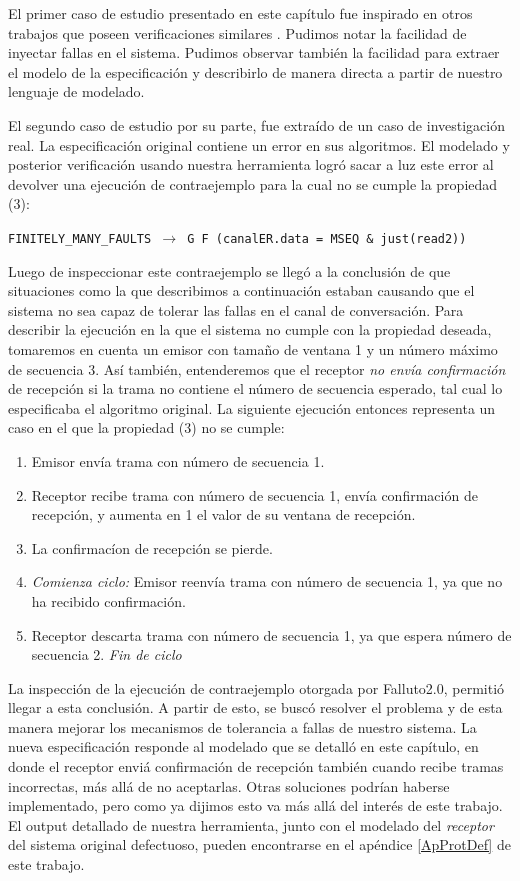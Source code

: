 \documentclass[pdftex,a4paper,12pt]{book}
\newcommand{\textff}[1]{\begin{center}\texttt{#1}\end{center}}
\begin{document}
El primer caso de estudio presentado en este cap\'itulo fue inspirado en otros trabajos que poseen verificaciones similares \cite{Hames,Arora}. Pudimos notar la facilidad de inyectar fallas en el sistema. Pudimos observar tambi\'en la facilidad para extraer el modelo de la especificaci\'on y describirlo de manera directa a partir de nuestro lenguaje de modelado.

El segundo caso de estudio por su parte, fue extra\'ido de un caso de investigaci\'on real. La especificaci\'on original contiene un error en sus algoritmos. El modelado y posterior verificaci\'on usando nuestra herramienta logr\'o sacar a luz este error al devolver una ejecuci\'on de contraejemplo para la cual no se cumple la propiedad (3): \textff{FINITELY\_MANY\_FAULTS $\rightarrow$ G~F~(canalER.data = MSEQ~\&~just(read2))} Luego de inspeccionar este contraejemplo se lleg\'o a la conclusi\'on de que situaciones como la que describimos a continuaci\'on estaban causando que el sistema no sea capaz de tolerar las fallas en el canal de conversaci\'on. Para describir la ejecuci\'on en la que el sistema no cumple con la propiedad deseada, tomaremos en cuenta un emisor con tama\~no de ventana 1 y un n\'umero m\'aximo de secuencia 3. As\'i tambi\'en, entenderemos que el receptor \textit{no env\'ia confirmaci\'on} de recepci\'on si la trama no contiene el n\'umero de secuencia esperado, tal cual lo especificaba el algoritmo original. La siguiente ejecuci\'on entonces representa un caso en el que la propiedad (3) no se cumple:

\begin{enumerate}
\item Emisor env\'ia trama con n\'umero de secuencia 1.
\item Receptor recibe trama con n\'umero de secuencia 1, env\'ia confirmaci\'on de recepci\'on, y aumenta en 1 el valor de su ventana de recepci\'on.
\item La confirmac\'ion de recepci\'on se pierde.
\item \textit{Comienza ciclo:} Emisor reenv\'ia trama con n\'umero de secuencia 1, ya que no ha recibido confirmaci\'on.
\item Receptor descarta trama con n\'umero de secuencia 1, ya que espera n\'umero de secuencia 2. \textit{Fin de ciclo}
\end{enumerate}

La inspecci\'on de la ejecuci\'on de contraejemplo otorgada por Falluto2.0, permiti\'o llegar a esta conclusi\'on. A partir de esto, se busc\'o resolver el problema y de esta manera mejorar los mecanismos de tolerancia a fallas de nuestro sistema. La nueva especificaci\'on responde al modelado que se detall\'o en este cap\'itulo, en donde el receptor envi\'a confirmaci\'on de recepci\'on tambi\'en cuando recibe tramas incorrectas, m\'as all\'a de no aceptarlas. Otras soluciones podr\'ian haberse implementado, pero como ya dijimos esto va m\'as all\'a del inter\'es de este trabajo. El output detallado de nuestra herramienta, junto con el modelado del \textit{receptor} del sistema original defectuoso, pueden encontrarse en el ap\'endice \ref{ApProtDef} de este trabajo.
\end{document}
